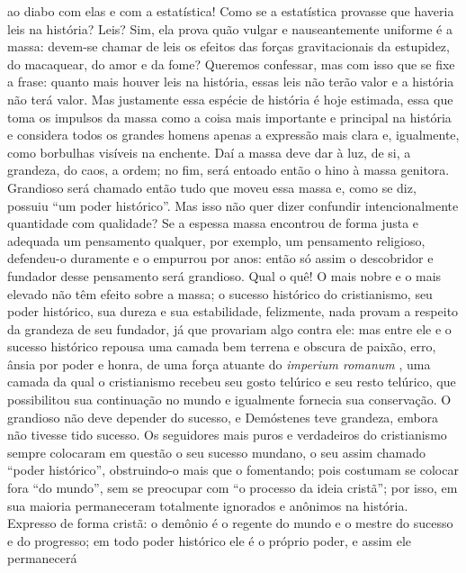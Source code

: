     ao diabo com elas e com a estatística! Como se a estatística
    provasse que haveria leis na história? Leis? Sim, ela prova quão
    vulgar e nauseantemente uniforme é a massa: devem-se chamar de leis
    os efeitos das forças gravitacionais da estupidez, do macaquear, do
    amor e da fome? Queremos confessar, mas com isso que se fixe a
    frase: quanto mais houver leis na história, essas leis não terão
    valor e a história não terá valor. Mas justamente essa espécie de
    história é hoje estimada, essa que toma os impulsos da massa como a
    coisa mais importante e principal na história e considera todos os
    grandes homens apenas a expressão mais clara e, igualmente, como
    borbulhas visíveis na enchente. Daí a massa deve dar à luz, de si, a
    grandeza, do caos, a ordem; no fim, será entoado então o hino à
    massa genitora. Grandioso será chamado então tudo que moveu essa
    massa e, como se diz, possuiu ``um poder histórico''. Mas isso não
    quer dizer confundir intencionalmente quantidade com qualidade? Se a
    espessa massa encontrou de forma justa e adequada um pensamento
    qualquer, por exemplo, um pensamento religioso, defendeu-o duramente
    e o empurrou por anos: então só assim o descobridor e fundador desse
    pensamento será grandioso. Qual o quê! O mais nobre e o mais elevado
    não têm efeito sobre a massa; o sucesso histórico do cristianismo,
    seu poder histórico, sua dureza e sua estabilidade, felizmente, nada
    provam a respeito da grandeza de seu fundador, já que provariam algo
    contra ele: mas entre ele e o sucesso histórico repousa uma camada
    bem terrena e obscura de paixão, erro, ânsia por poder e honra, de
    uma força atuante do \emph{imperium romanum}
    , uma camada da qual o
    cristianismo recebeu seu gosto telúrico e seu resto telúrico, que
    possibilitou sua continuação no mundo e igualmente fornecia sua
    conservação. O grandioso não deve depender do sucesso, e Demóstenes
    teve grandeza, embora não tivesse tido sucesso. Os seguidores mais
    puros e verdadeiros do cristianismo sempre colocaram em questão o
    seu sucesso mundano, o seu assim chamado ``poder histórico'',
    obstruindo-o mais que o fomentando; pois costumam se colocar fora
    ``do mundo'', sem se preocupar com ``o processo da ideia cristã'';
    por isso, em sua maioria permaneceram totalmente ignorados e
    anônimos na história. Expresso de forma cristã: o demônio é o
    regente do mundo e o mestre do sucesso e do progresso; em todo poder
    histórico ele é o próprio poder, e assim ele permanecerá
